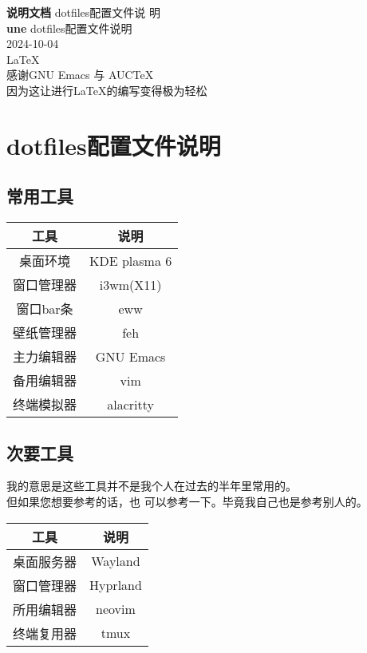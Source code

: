 \documentclass[11pt]{article}
\date{\today}
\title{}
\begin{document}
\begin{titlepage}
  \begin{center}
    \vspace*{1cm} \textbf{说明文档} \vspace{0.5cm} dotfiles配置文件说
    明\vspace{1.5cm} \\ \textbf{une} \vfill dotfiles配置文件说明\vspace{0.8cm}
    \\ 2024-10-04 \\ \LaTeX \\ \vspace{0.6cm} 感谢GNU Emacs 与 AUCTeX \\ 因为这让进行\LaTeX{}的编写变得极为轻松
  \end{center}
\end{titlepage}

\tableofcontents

\section{dotfiles配置文件说明}

\subsection{常用工具}
\begin{center}
  \begin{tabular}{|c|c|}
    \hline
    工具 & 说明 \\
    \hline
    桌面环境 & KDE plasma 6 \\ 
    窗口管理器 & i3wm(X11) \\
    窗口bar条 & eww \\
    壁纸管理器 & feh \\  
    主力编辑器 & GNU Emacs \\
    备用编辑器 & vim \\
    终端模拟器 & alacritty \\
    \hline
  \end{tabular}
\end{center}

\subsection{次要工具}
我的意思是这些工具并不是我个人在过去的半年里常用的。 \\ 但如果您想要参考的话，也
可以参考一下。毕竟我自己也是参考别人的。
\begin{center}
  \begin{tabular}{|c|c|}
    \hline
    工具 & 说明 \\
    \hline  
    桌面服务器 & Wayland \\
    窗口管理器 & Hyprland \\
    所用编辑器 & neovim \\
    终端复用器 & tmux \\ 
    \hline
  \end{tabular}  
\end{center}
\end{document}
